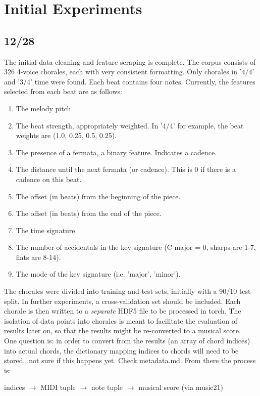 \documentclass[12pt]{article}
\begin{document}
\maketitle


\section{Initial Experiments}

\subsection{12/28}
The initial data cleaning and feature scraping is complete. The corpus consists of 326 4-voice chorales, each with very consistent formatting. Only chorales in '4/4' and '3/4' time were found. Each beat contains four notes. Currently, the features selected from each beat are as follows:
\begin{enumerate}
\item The melody pitch
\item The beat strength, appropriately weighted. In '4/4' for example, the beat weights are (1.0, 0.25, 0.5, 0.25).
\item The presence of a fermata, a binary feature. Indicates a cadence.
\item The distance until the next fermata (or cadence). This is 0 if there is a cadence on this beat.
\item The offset (in beats) from the beginning of the piece.
\item The offset (in beats) from the end of the piece.
\item The time signature.
\item The number of accidentals in the key signature (C major = 0, sharps are 1-7, flats are 8-14).
\item The mode of the key signature (i.e. 'major', 'minor').
\end{enumerate}

The chorales were divided into training and test sets, initially with a 90/10 test split. In further experiments, a cross-validation set should be included. Each chorale is then written to a \textit{separate} HDF5 file to be processed in torch. The isolation of data points into chorales is meant to facilitate the evaluation of results later on, so that the results might be re-converted to a musical score. \\

One question is: in order to convert from the results (an array of chord indices) into actual chords, the dictionary mapping indices to chords will need to be stored...not sure if this happens yet. Check metadata.md. From there the process is:
\begin{center}
indices $\to$ MIDI tuple $\to$ note tuple $\to$ musical score (via music21)
\end{center}
\end{document}
